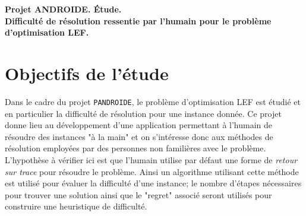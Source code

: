 \documentclass[a4paper, 10pt]{article}
\begin{document}
	\begin{center}
		\textbf{Projet ANDROIDE. Étude.}\\
		\textbf{Difficulté de résolution ressentie par l'humain pour le problème d'optimisation LEF.}\\[0.5cm]
	\end{center}
	
	\section*{Objectifs de l'étude}
	
	Dans le cadre du projet \texttt{PANDROIDE}, le problème d'optimisation LEF est étudié et en particulier la difficulté de résolution pour une instance donnée. Ce projet donne lieu au développement d'une application permettant à l'humain de résoudre des instances "à la main" et on s'intéresse donc aux méthodes de résolution employées par des personnes non familières avec le problème.\\
	
	L'hypothèse à vérifier ici est que l'humain utilise par défaut une forme de \textit{retour sur trace} pour résoudre le problème. Ainsi un algorithme utilisant cette méthode est utilisé pour évaluer la difficulté d'une instance; le nombre d'étapes nécessaires pour trouver une solution ainsi que le "regret" associé seront utilisés pour construire une heuristique de difficulté.
	
\end{document}
